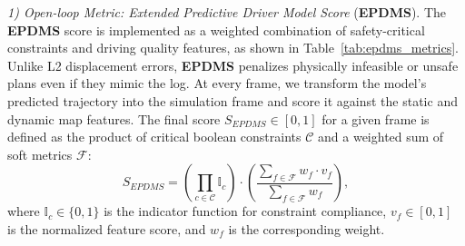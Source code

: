 \documentclass{article}
\begin{document}
\textit{1) Open-loop Metric: Extended Predictive Driver Model Score} (\textbf{EPDMS}). The \textbf{EPDMS} score is implemented as a weighted combination of safety-critical constraints and driving quality features, as shown in Table~\ref{tab:epdms_metrics}. Unlike L2 displacement errors, \textbf{EPDMS} penalizes physically infeasible or unsafe plans even if they mimic the log. At every frame, we transform the model’s predicted trajectory into the simulation frame and score it against the static and dynamic map features. The final score $S_{EPDMS} \in [0, 1]$ for a given frame is defined as the product of critical boolean constraints $\mathcal{C}$ and a weighted sum of soft metrics $\mathcal{F}$:
\begin{equation}
    S_{EPDMS} = \left( \prod_{c \in \mathcal{C}} \mathbb{I}_c \right) \cdot \left( \frac{\sum_{f \in \mathcal{F}} w_f \cdot v_f}{\sum_{f \in \mathcal{F}} w_f} \right),
\end{equation}
where $\mathbb{I}_c \in \{0, 1\}$ is the indicator function for constraint compliance, $v_f \in [0, 1]$ is the normalized feature score, and $w_f$ is the corresponding weight.  
\end{document}
